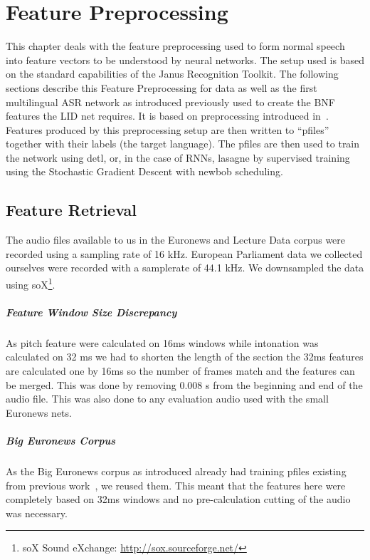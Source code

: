 \chapter{Feature Preprocessing}
\label{ch:FP}

This chapter deals with the feature preprocessing used to form normal speech into feature vectors to be understood by neural networks. The setup used is based on the standard capabilities of the Janus Recognition Toolkit. The following sections describe this Feature Preprocessing for data as well as the first multilingual ASR network as introduced previously used to create the BNF features the LID net requires.  It is based on preprocessing introduced in~\cite{Mueller2016b}.
Features produced by this preprocessing setup are then written to ``pfiles'' together with their labels (the target language). The pfiles are then used to train the network using detl, or, in the case of RNNs, lasagne by supervised training using the Stochastic Gradient Descent with newbob scheduling.

\section{Feature Retrieval}
\label{sec:FP:FA}
The audio files available to us in the Euronews and Lecture Data corpus were recorded using a sampling rate of 16 kHz. European Parliament data we collected ourselves were recorded with a samplerate of 44.1 kHz. We downsampled the data using soX\footnote{soX Sound eXchange: \url{http://sox.sourceforge.net/}}. 
\paragraph{Feature Window Size Discrepancy} As pitch feature were calculated on 16ms windows while intonation was calculated on 32 ms we had to shorten the length of the section the 32ms features are calculated one by 16ms so the number of frames match and the features can be merged. This was done by removing  0.008 s from the beginning and end of the audio file. This was also done to any evaluation audio used with the small Euronews nets.
\paragraph{Big Euronews Corpus} As the Big Euronews corpus as introduced already had training pfiles existing from previous work~\cite{Mueller2016b}, we reused them. This meant that the features here were completely based on 32ms windows and no pre-calculation cutting of the audio was necessary.

